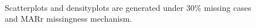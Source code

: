 \documentclass[12pt, fullpage, a4paper]{article}
\begin{document}
\begin{figure}[t]
\begin{center}
{{			}
		}\\ 	
	\end{center}
	\caption{Scatterplots and densityplots are generated under 30\% missing cases and MARr missingness mechanism.}
	\label{fig3}
\end{figure}
\end{document}
